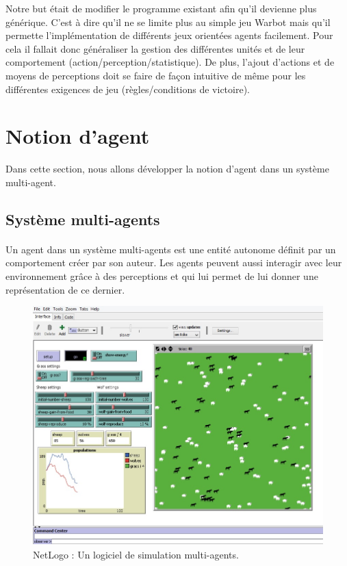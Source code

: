 \documentclass{report}
\begin{document}
Notre but était de modifier le programme existant afin qu'il devienne plus générique. C'est à dire qu'il ne se limite plus au simple jeu Warbot mais qu'il permette l'implémentation de différents jeux orientées agents facilement. 
Pour cela il fallait donc généraliser la gestion des différentes unités et de leur comportement (action/perception/statistique). De plus, l'ajout d'actions et de moyens de perceptions doit se faire de façon intuitive de même pour les différentes exigences de jeu (règles/conditions de victoire). 

\section{Notion d'agent}
Dans cette section, nous allons développer la notion d'agent dans un système multi-agent.
\subsection{Système multi-agents}
\paragraph{} Un agent dans un système multi-agents est une entité autonome définit par un comportement créer par son auteur. Les agents peuvent aussi interagir avec leur environnement grâce à des perceptions et qui lui permet de lui donner une représentation de ce dernier. 

\begin{figure}[h]
\centering
\includegraphics[scale=0.65]{NetLogoImage}
\caption{NetLogo : Un logiciel de simulation multi-agents.}
\end{figure}
\end{document}
